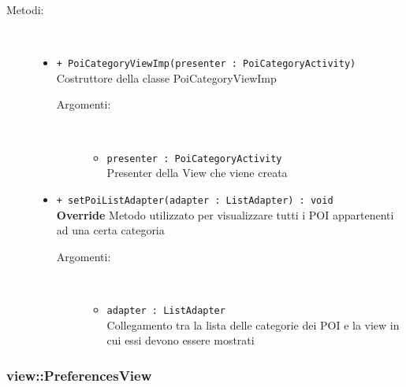 \documentclass[../DefinizioneDiProdotto.tex]{subfiles}
\begin{document}
\begin{description}
\begin{itemize}
\end{itemize}
\item[Metodi:] \
\begin{itemize}
\item \texttt{+ PoiCategoryViewImp(presenter : PoiCategoryActivity)}\\
Costruttore della classe PoiCategoryViewImp
 \begin{description}
\item[Argomenti:] \
\begin{itemize}
\item \texttt{presenter : PoiCategoryActivity}\\
Presenter della View che viene creata\end{itemize}
\end{description}
\item \texttt{+ setPoiListAdapter(adapter : ListAdapter) : void}\\
\textbf{Override} Metodo utilizzato per visualizzare tutti i POI appartenenti ad una certa categoria
 \begin{description}
\item[Argomenti:] \
\begin{itemize}
\item \texttt{adapter : ListAdapter}\\
Collegamento tra la lista delle categorie dei POI e la view in cui essi devono essere mostrati\end{itemize}
\end{description}
\end{itemize}
\end{description}

\subsubsection{view::PreferencesView}
\end{document}
